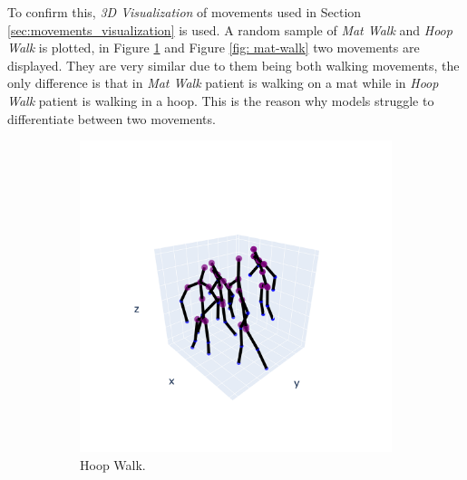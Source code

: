             \newpage

            To confirm this, \textit{3D Visualization} of movements used in Section \ref{sec:movements_visualization} is used. A random sample of \textit{Mat Walk} and \textit{Hoop Walk} is plotted, in Figure \ref{fig: hoop-walk} and Figure \ref{fig: mat-walk} two movements are displayed. They are very similar due to them being both walking movements, the only difference is that in \textit{Mat Walk} patient is walking on a mat while in \textit{Hoop Walk} patient is walking in a hoop. This is the reason why models struggle to differentiate between two movements.

            \begin{figure}[h]
                \begin{subfigure}{.5\textwidth}
                \centering
                  \includegraphics[width=1.\linewidth]{../src/resources/plots/movements/mov-1.png}
                  \caption{Hoop Walk.}
                  \label{fig: hoop-walk}
                \end{subfigure}
                \begin{subfigure}{.5\textwidth}
                \centering

\end{subfigure}
\end{figure}
